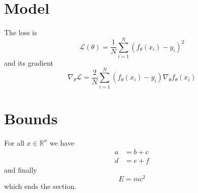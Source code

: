 \documentclass{article}
\newcommand{\R}{\mathbb{R}}
\begin{document}
\section{Model}
The loss is
\begin{equation}
  \mathcal{L}(\theta) = \frac{1}{N} \sum_{i=1}^{N} (f_\theta(x_i) - y_i)^2 \label{eq:loss}
\end{equation}
and its gradient
\begin{equation}
  \nabla_\theta \mathcal{L} = \frac{2}{N} \sum_{i=1}^{N} (f_\theta(x_i) - y_i) \nabla_\theta f_\theta(x_i) \label{eq:grad}
\end{equation}
\section{Bounds}
For all $x \in \R^n$ we have
\begin{align}
  a &= b + c \label{eq:first} \\
  d &= e + f \label{eq:second}
\end{align}
and finally
\begin{equation}
  E = m c^2 \label{eq:energy}
\end{equation}
which ends the section.
\end{document}
